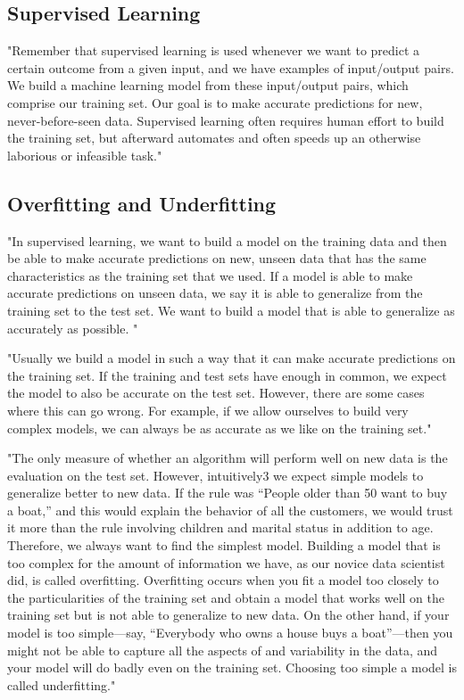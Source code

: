 \subsection{Supervised Learning}

"Remember that supervised learning is used whenever we want to predict a
certain outcome from a given input, and we have examples of input/output
pairs. We build a machine learning model from these input/output pairs,
which comprise our training set. Our goal is to make accurate
predictions for new, never-before-seen data. Supervised learning often
requires human effort to build the training set, but afterward
automates and often speeds up an otherwise laborious or infeasible task." \cite[p. 34]{muller_introductionmachinelearning_2016}

\subsection{Overfitting and Underfitting}
"In supervised learning, we want to build a model on the training data
and then be able to make accurate predictions on new, unseen data that
has the same characteristics as the training set that we used. If a
model is able to make accurate predictions on unseen data, we say it is
able to generalize from the training set to the test set. We want to
build a model that is able to generalize as accurately as possible. " \cite[p. 35]{muller_introductionmachinelearning_2016}

"Usually we build a model in such a way that it can make accurate
predictions on the training set. If the training and test sets have
enough in common, we expect the model to also be accurate on the test
set. However, there are some cases where this can go wrong. For example,
if we allow ourselves to build very complex models, we can always be as
accurate as we like on the training set." 
\cite[p. 35]{muller_introductionmachinelearning_2016}

"The only measure of whether an algorithm will perform well on new data
is the evaluation on the test set. However, intuitively3 we expect simple models to generalize
better to new data. If the rule was “People older than 50 want to buy a
boat,” and this would explain the behavior of all the
customers, we would trust it more than the rule involving children and
marital status in addition to age. Therefore, we always want to find
the simplest model. Building a model that is too complex for the amount
of information we have, as our novice data scientist did, is called
overfitting. Overfitting occurs when you fit a model too closely to
the particularities of the training set and obtain a model that works
well on the training set but is not able to generalize to new data. On
the other hand, if your model is too simple—say, “Everybody who owns a
house buys a boat”—then you might not be able to capture all the
aspects of and variability in the data, and your model will do badly even
on the training set. Choosing too simple a model is called
underfitting."  \cite[p. 35]{muller_introductionmachinelearning_2016}

